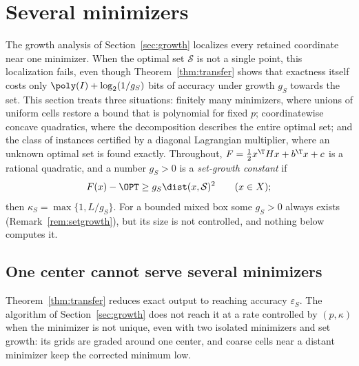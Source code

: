 \section{Several minimizers}\label{sec:optsets}
The growth analysis of Section~\ref{sec:growth} localizes every retained
coordinate near one minimizer. When the optimal set $\mathcal S$ is not a
single point, this localization fails, even though Theorem~\ref{thm:transfer}
shows that exactness itself costs only $\poly(I)+\log_2(1/g_S)$ bits of
accuracy under growth $g_S$ towards the set. This section treats three
situations: finitely many minimizers, where unions of uniform cells restore a
bound that is polynomial for fixed $p$; coordinatewise concave quadratics,
where the decomposition describes the entire optimal set; and the class of
instances certified by a diagonal Lagrangian multiplier, where an unknown
optimal set is found exactly. Throughout, $F=\frac12x^\T Hx+b^\T x+c$ is a
rational quadratic, and a number $g_S>0$ is a \emph{set-growth constant} if
\begin{equation}\label{eq:setgrowth}
F(x)-\OPT\ge g_S\dist(x,\mathcal S)^2\qquad(x\in X);
\end{equation}
then $\kappa_S=\max\{1,L/g_S\}$. For a bounded mixed box some $g_S>0$ always
exists (Remark~\ref{rem:setgrowth}), but its size is not controlled, and
nothing below computes it.

\subsection{One center cannot serve several minimizers}\label{sec:exact-nonunique}

Theorem~\ref{thm:transfer} reduces exact output to reaching accuracy
$\varepsilon_S$. The algorithm of Section~\ref{sec:growth} does not reach it
at a rate controlled by $(p,\kappa)$ when the minimizer is not unique, even
with two isolated minimizers and set growth: its grids are graded around one
center, and coarse cells near a distant minimizer keep the corrected minimum
low.

